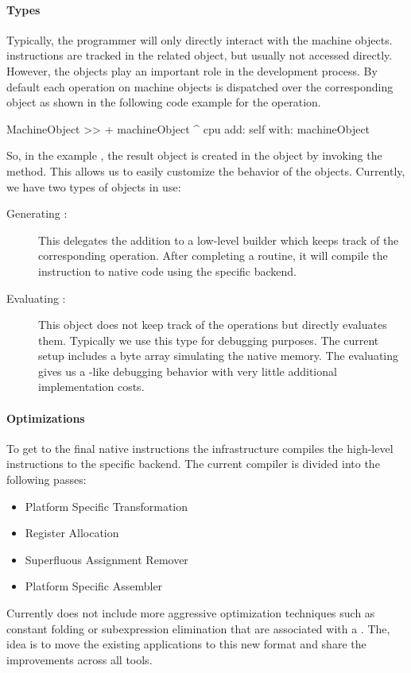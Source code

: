 \paragraph{\CPU Types}
Typically, the \VCPU programmer will only directly interact with the machine objects.
\VCPU instructions are tracked in the related \CPU object, but usually not accessed directly.
However, the \CPU objects play an important role in the development process.
By default each operation on machine objects is dispatched over the corresponding \CPU object as shown in the following code example for the \ttt{+} operation.
%
\begin{stcode}{4}
MachineObject >> + machineObject
	^ cpu add: self with: machineObject
\end{stcode}
%
So, in the example , the result object  is created in the \CPU object by invoking the  method.
This allows us to easily customize the behavior of the \CPU objects.
Currently, we have two types of \CPU objects in use:
\begin{description}
	\item[Generating \CPU:] This \CPU delegates the addition to a low-level builder which keeps track of the corresponding \TAC operation.
	After completing a routine, it will compile the \TAC instruction to native code using the specific \ASM backend.
	
	\item[Evaluating \CPU:] This \CPU object does not keep track of the \TAC operations but directly evaluates them.
	Typically we use this \CPU type for debugging purposes.
	The current setup includes a byte array simulating the native memory.
	The evaluating \CPU gives us a \PH-like debugging behavior with very little additional implementation costs.
\end{description}


\paragraph{\VCPU Optimizations}
To get to the final native instructions the \VCPU infrastructure compiles the high-level \TAC instructions to the specific backend.
The current compiler is divided into the following passes:
%
\begin{itemize}[noitemsep]
	\item Platform Specific Transformation
	\item Register Allocation
	\item Superfluous Assignment Remover
	\item Platform Specific Assembler
\end{itemize}
%
\noindent Currently \VCPU does not include more aggressive optimization techniques such as constant folding or subexpression elimination that are associated with a  \TAC \IR.
The, idea is to move the existing \B applications to this new \VCPU format and share the improvements across all tools.

